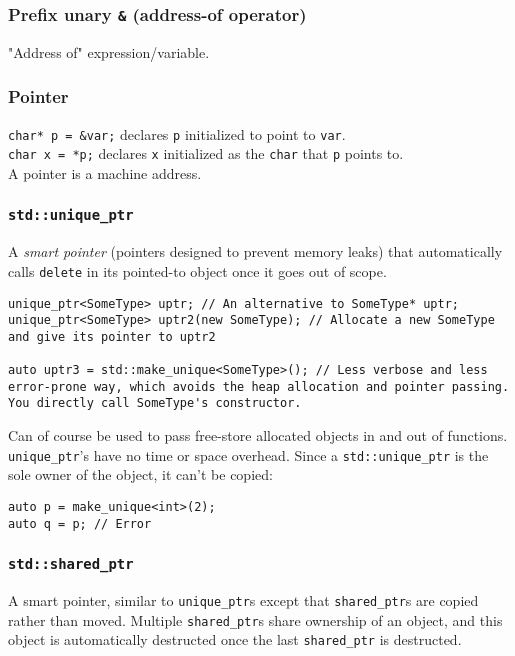 \documentclass[8pt, table, xcdraw]{article}%
\begin{document}
\subsubsection{Prefix unary \lstinline{&} (address-of operator)}
"Address of" expression/variable.

\subsubsection{Pointer}
\lstinline{char* p = &var;} declares \lstinline{p} initialized to point to \lstinline{var}.\\
\lstinline{char x = *p;} declares \lstinline{x} initialized as the \lstinline{char} that \lstinline{p} points to.\\
A pointer is a machine address.

\subsubsection{\lstinline{std::unique_ptr}} \label{unique_ptr}
A \emph{smart pointer} (pointers designed to prevent memory leaks) that automatically calls \lstinline{delete} in its pointed-to object once it goes out of scope.

\begin{lstlisting}
unique_ptr<SomeType> uptr; // An alternative to SomeType* uptr;
unique_ptr<SomeType> uptr2(new SomeType); // Allocate a new SomeType and give its pointer to uptr2

auto uptr3 = std::make_unique<SomeType>(); // Less verbose and less error-prone way, which avoids the heap allocation and pointer passing. You directly call SomeType's constructor.
\end{lstlisting}

Can of course be used to pass free-store allocated objects in and out of functions. \lstinline{unique_ptr}'s have no time or space overhead. Since a \lstinline{std::unique_ptr} is the sole owner of the object, it can't be copied:

\begin{lstlisting}
auto p = make_unique<int>(2);
auto q = p; // Error
\end{lstlisting}

\subsubsection{\lstinline{std::shared_ptr}} \label{shared_ptr}

A smart pointer, similar to \lstinline{unique_ptr}s except that \lstinline{shared_ptr}s are copied rather than moved. Multiple \lstinline{shared_ptr}s share ownership of an object, and this object is automatically destructed once the last \lstinline{shared_ptr} is destructed.
\end{document}
